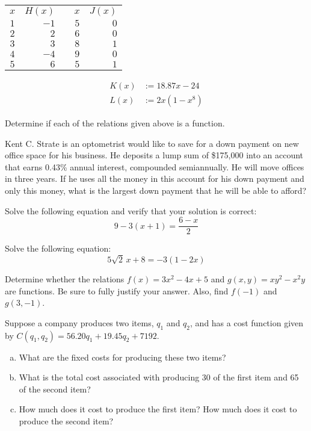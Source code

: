 \documentclass[11pt,letterpaper]{article}
\begin{document}
	\begin{minipage}[b]{0.49\textwidth}
	\centering
	\begin{tabular}{c|rcc|r}
	$x$ & $H(x)$ & \hspace{1cm} & $x$ & $J(x)$ \\ \cline{1-2} \cline{4-5}
	$1$ & $-1$ & & $5$ & $0$ \\
	$2$ & $2$ & & $6$ & $0$ \\
	$3$ & $3$ & & $8$ & $1$ \\
	$4$ & $-4$ & & $9$ & $0$ \\
	$5$ & $6$ & & $5$ & $1$
	\end{tabular}
	\end{minipage}
	\begin{minipage}[b]{0.49\textwidth}
	\[
	\begin{aligned}
	K(x)&:= 18.87x - 24 \\[0.6cm]
	L(x)&:= 2x(1 - x^8)
	\end{aligned}
	\]
	\end{minipage} \pvspace{0.6cm}
	
Determine if each of the relations given above is a function. \pspace


\prob Kent C. Strate is an optometrist would like to save for a down payment on new office space for his business. He deposits a lump sum of \$175,000 into an account that earns 0.43\% annual interest, compounded semiannually. He will move offices in three years. If he uses all the money in this account for his down payment and only this money, what is the largest down payment that he will be able to afford? \pspace


\prob Solve the following equation and verify that your solution is correct:
	\[
	9 - 3(x + 1)= \dfrac{6 - x}{2}
	\] \pspace


\prob Solve the following equation:
	\[
	5\sqrt{2}\, x + 8= -3(1 - 2x)
	\]  \pspace


\prob Determine whether the relations $f(x)= 3x^2 - 4x + 5$ and $g(x, y)= xy^2 - x^2y$ are functions. Be sure to fully justify your answer. Also, find $f(-1)$ and $g(3, -1)$.  \pspace


\prob Suppose a company produces two items, $q_1$ and $q_2$, and has a cost function given by $C(q_1, q_2)= 56.20q_1 + 19.45q_2 + 7192$. 
	\begin{enumerate}[(a)]
	\item What are the fixed costs for producing these two items?
	\item What is the total cost associated with producing 30 of the first item and 65 of the second item?
	\item How much does it cost to produce the first item? How much does it cost to produce the second item?
	\end{enumerate} \pspace
\end{document}
